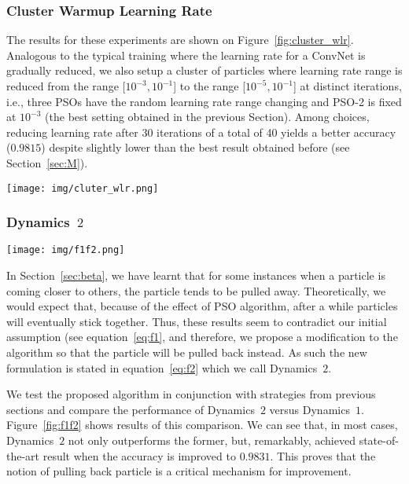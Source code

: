 \documentclass{ieeeaccess}
\begin{document}
\subsubsection{Cluster Warmup Learning Rate}
The results for these experiments are shown on Figure~\ref{fig:cluster_wlr}. Analogous to the typical training where the learning rate for a ConvNet is gradually reduced, we also setup a cluster of particles where learning rate range is reduced from the range [$10^{-3},10^{-1}$] to the range [$10^{-5},10^{-1}$] at distinct iterations, i.e., three PSOs have the random learning rate range changing and PSO-2 is fixed at $10^{-3}$ (the best setting obtained in the previous Section). Among choices, reducing learning rate after 30 iterations of a total of 40 yields a better accuracy ($0.9815$) despite slightly lower than the best result obtained before (see Section~\ref{sec:M}).
\begin{figure*}[htb!]
\begin{center}
\texttt{[image: img/cluter\_wlr.png]}
\caption{Results for cluster warmup learning rates.}
\label{fig:cluster_wlr}
\end{center}
\end{figure*}
\subsubsection{Dynamics~$2$}
\label{sec:d2}
\begin{figure*}[htb!]
\begin{center}
\texttt{[image: img/f1f2.png]}
\caption{Comparison of accuracy performance between Dynamics~$1$ and Dynamics~$2$. The latter outperforms the former and the best accuracy is further improved.}
\label{fig:f1f2}
\end{center}
\end{figure*}
In Section~\ref{sec:beta}, we have learnt that for some instances when a particle is coming closer to others, the particle tends to be pulled away. Theoretically, we would expect that, because of the effect of PSO algorithm, after a while particles will eventually stick together. Thus, these results seem to contradict our initial assumption (see equation~\eqref{eq:f1}, and therefore, we propose a modification to the algorithm so that the particle will be pulled back instead. As such the new formulation is stated in equation~\eqref{eq:f2} which we call Dynamics~$2$. 

We test the proposed algorithm in conjunction with strategies from previous sections and compare the performance of Dynamics~$2$ versus Dynamics~$1$. Figure~\ref{fig:f1f2} shows results of this comparison. We can see that, in most cases, Dynamics~$2$ not only outperforms the former, but, remarkably, achieved state-of-the-art result when the accuracy is improved to $0.9831$. This proves that the notion of pulling back particle is a critical mechanism for improvement.
\end{document}
